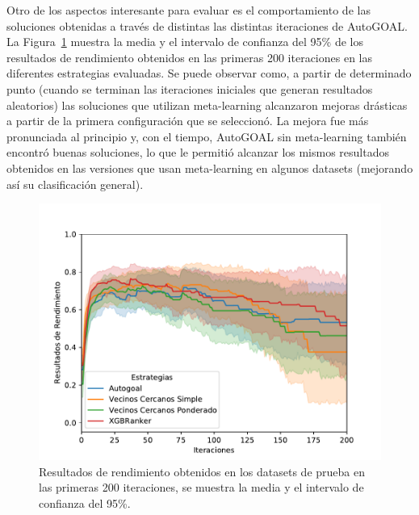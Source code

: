 Otro de los aspectos interesante para evaluar es el comportamiento de las soluciones obtenidas a través de distintas las distintas iteraciones de AutoGOAL. La Figura~\ref{fig:performance} muestra la media y el intervalo de confianza del 95\% de los resultados de rendimiento obtenidos en las primeras 200 iteraciones en las diferentes estrategias evaluadas. Se puede observar como, a partir de determinado punto (cuando se terminan las iteraciones iniciales que generan resultados aleatorios) las soluciones que utilizan meta-learning alcanzaron mejoras drásticas a partir de la primera configuración que se seleccionó. La mejora fue más pronunciada al principio y, con el tiempo, AutoGOAL sin meta-learning también encontró buenas soluciones, lo que le permitió alcanzar los mismos resultados obtenidos en las versiones que usan meta-learning en algunos datasets (mejorando así su clasificación general). 


\begin{figure}[H]
\centering
\includegraphics[scale=.8]{Figures/performance.pdf}
\caption{Resultados de rendimiento obtenidos en los datasets de prueba en las primeras 200 iteraciones, se muestra la media y el intervalo de confianza del 95\%.}
\label{fig:performance}
\end{figure}

